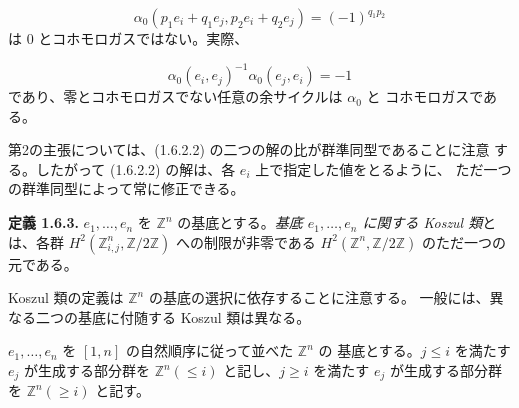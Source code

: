 \begin{equation*}
  \alpha_0(p_1e_i+q_1e_j,p_2e_i+q_2e_j)=(-1)^{q_1p_2}
\end{equation*}
は $0$ とコホモロガスではない。実際、

\begin{equation*}
  \alpha_0(e_i,e_j)^{-1}\alpha_0(e_j,e_i)=-1
\end{equation*}
であり、零とコホモロガスでない任意の余サイクルは $\alpha_0$ と
コホモロガスである。

第2の主張については、(1.6.2.2) の二つの解の比が群準同型であることに注意
する。したがって (1.6.2.2) の解は、各 $e_i$ 上で指定した値をとるように、
ただ一つの群準同型によって常に修正できる。

\noindent\textbf{定義 1.6.3.}\quad
$e_1,\ldots,e_n$ を $\mathbb Z^n$ の基底とする。\emph{基底
$e_1,\ldots,e_n$ に関する Koszul 類}とは、各群
$H^2(\mathbb Z^n_{i,j},\mathbb Z/2\mathbb Z)$ への制限が非零である
$H^2(\mathbb Z^n,\mathbb Z/2\mathbb Z)$ のただ一つの元である。

Koszul 類の定義は $\mathbb Z^n$ の基底の選択に依存することに注意する。
一般には、異なる二つの基底に付随する Koszul 類は異なる。

$e_1,\ldots,e_n$ を $[1,n]$ の自然順序に従って並べた $\mathbb Z^n$ の
基底とする。$j\leq i$ を満たす $e_j$ が生成する部分群を
$\mathbb Z^n(\leq i)$ と記し、$j\geq i$ を満たす $e_j$ が生成する部分群を
$\mathbb Z^n(\geq i)$ と記す。
